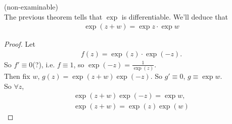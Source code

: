 \documentclass[a4paper]{article}
\begin{document}
\begin{eg}(non-examinable)\\
The previous theorem tells that $\exp$ is differentiable. We'll deduce that
\begin{equation*}
\begin{aligned}
\exp\left(z+w\right) = \exp z \cdot \exp w
\end{aligned}
\end{equation*}
\begin{proof}
Let
\begin{equation*}
\begin{aligned}
f\left(z\right) = \exp\left(z\right)\cdot\exp\left(-z\right).
\end{aligned}
\end{equation*}
So $f' \equiv 0$(?), i.e. $f \equiv 1$, so $\exp\left(-z\right) = \frac{1}{\exp\left(z\right)}$.\\
Then fix $w$, $g\left(z\right) = \exp\left(z+w\right)\exp\left(-z\right)$. So $g' \equiv 0$, $g\equiv \exp w$.\\
So $\forall z$,
\begin{equation*}
\begin{aligned}
\exp\left(z+w\right)\exp\left(-z\right) = \exp w,\\
\exp\left(z+w\right) = \exp\left(z\right) \exp\left(w\right)
\end{aligned}
\end{equation*}
\end{proof}
\end{eg}
\end{document}
